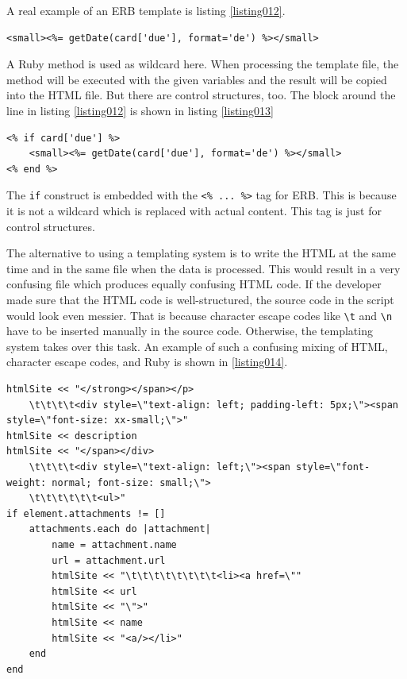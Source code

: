 A real example of an ERB template is listing \ref{listing012}.

\begin{lstlisting}[aboveskip=1\baselineskip, caption=Ruby method in ERB template., label=listing012]
<small><%= getDate(card['due'], format='de') %></small>
\end{lstlisting}

A Ruby method is used as wildcard here. When processing the template file, the method will be executed with the given variables and the result will be copied into the HTML file. But there are control structures, too. The block around the line in listing \ref{listing012} is shown in listing \ref{listing013}

\begin{lstlisting}[aboveskip=1\baselineskip, caption=Ruby method in ERB template., label=listing013]
<% if card['due'] %>
	<small><%= getDate(card['due'], format='de') %></small>
<% end %>
\end{lstlisting}

The \lstinline{if} construct is embedded with the \lstinline{<% ... %>} tag for ERB. This is because it is not a wildcard which is replaced with actual content. This tag is just for control structures.

The alternative to using a templating system is to write the HTML at the same time and in the same file when the data is processed. This would result in a very confusing file which produces equally confusing HTML code. If the developer made sure that the HTML code is well-structured, the source code in the script would look even messier. That is because character escape codes like \lstinline{\t} and \lstinline{\n} have to be inserted manually in the source code. Otherwise, the templating system takes over this task. An example of such a confusing mixing of HTML, character escape codes, and Ruby is shown in \ref{listing014}.

\begin{lstlisting}[aboveskip=1\baselineskip, caption=Generating HTML without a templating engine., label=listing014]
htmlSite << "</strong></span></p>
	\t\t\t\t<div style=\"text-align: left; padding-left: 5px;\"><span style=\"font-size: xx-small;\">"
htmlSite << description		
htmlSite << "</span></div>
	\t\t\t\t<div style=\"text-align: left;\"><span style=\"font-weight: normal; font-size: small;\"> 
	\t\t\t\t\t\t<ul>"
if element.attachments != []
	attachments.each do |attachment|
		name = attachment.name
		url = attachment.url
		htmlSite << "\t\t\t\t\t\t\t\t<li><a href=\""
		htmlSite << url
		htmlSite << "\">"
		htmlSite << name
		htmlSite << "<a/></li>"
	end	
end	
\end{lstlisting}

